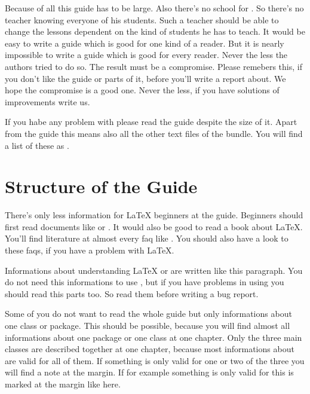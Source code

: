 Because of all this \KOMAScript{} guide has to be large. Also there's
no school for \KOMAScript. So there's no teacher knowing everyone of
his students. Such a teacher should be able to change the lessons
dependent on the kind of students he has to teach. It would be easy to
write a guide which is good for one kind of a reader. But it is nearly
impossible to write a guide which is good for every reader. Never the
less the authors tried to do so. The result must be a
compromise. Please remebers this, if you don't like the guide or
parts of it, before you'll write a report about. We hope the
compromise is a good one. Never the less, if you have solutions of
improvements write us.

If you habe any problem with \KOMAScript{} please read the guide
despite the size of it. Apart from the guide this means also all the
other text files of the bundle. You will find a list of these as
.


\section{Structure of the Guide}\label{sec:introduction.structure}

There's only less information for \LaTeX{} beginners at the guide.
Beginners should first read documents like \cite{lshort} or
\cite{latex:usrguide}. It would also be good to read a book about
\LaTeX. You'll find literature at almost every faq like \cite{UK:FAQ}.
You should also have a look to these faqs, if you have a problem with
\LaTeX{}.

\begin{Explain}
  Informations about understanding \LaTeX{} or \KOMAScript{} are
  written like this paragraph. You do not need this informations to
  use \KOMAScript{}, but if you have problems in using \KOMAScript you
  should read this parts too. So read them before writing a bug
  report.
\end{Explain}

Some of you do not want to read the whole guide but only informations
about one class or package. This should be possible, because you will
find almost all informations about one package or one class at one
chapter. Only the three main classes are described together at one
chapter, because most informations about are valid for all of them. If
something is only valid for one or two of the three you will find a
note at the margin. If for example something is only valid for
 this is marked at the
margin like here.



